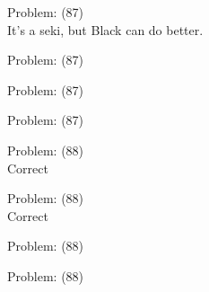 \documentclass[11pt]{article}
\begin{document}
\begin{minipage}[t]{0.5\textwidth}
  {\centering
  
  Problem: (87)\\
  It's a seki, but Black can do better.\\
  }
\end{minipage}
\begin{minipage}[t]{0.5\textwidth}
  {\centering
  
  Problem: (87)\\
  
  }
\end{minipage}
\begin{minipage}[t]{0.5\textwidth}
  {\centering
  
  Problem: (87)\\
  
  }
\end{minipage}
\begin{minipage}[t]{0.5\textwidth}
  {\centering
  
  Problem: (87)\\
  
  }
\end{minipage}
\begin{minipage}[t]{0.5\textwidth}
  {\centering
  
  Problem: (88)\\
  Correct\\
  }
\end{minipage}
\begin{minipage}[t]{0.5\textwidth}
  {\centering
  
  Problem: (88)\\
  Correct\\
  }
\end{minipage}
\begin{minipage}[t]{0.5\textwidth}
  {\centering
  
  Problem: (88)\\
  
  }
\end{minipage}
\begin{minipage}[t]{0.5\textwidth}
  {\centering
  
  Problem: (88)\\
  
  }
\end{minipage}
\end{document}
